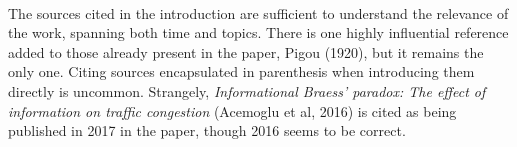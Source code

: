 \documentclass[../review.tex]{subfiles}
\begin{document}
 \textcolor{green}{\Large\checkmark}\\
The sources cited in the introduction are sufficient to understand the relevance of the work, spanning both time and topics. There is one highly influential reference added to those already present in the paper, Pigou (1920), but it remains the only one. Citing sources encapsulated in parenthesis when introducing them directly is uncommon. Strangely, \textit{Informational Braess' paradox: The
effect of information on traffic congestion} (Acemoglu et al, 2016) is cited as being published in 2017 in the paper, though 2016 seems to be correct.
\end{document}
